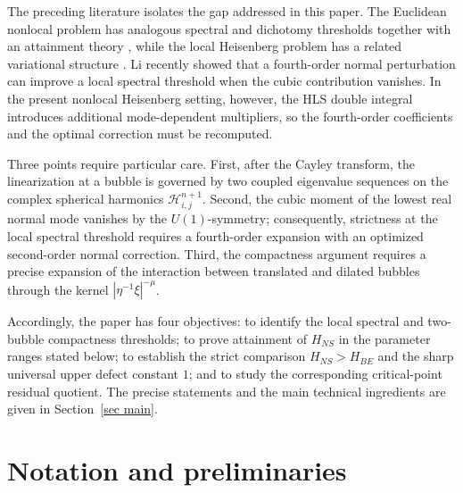 \documentclass[11pt]{article}
\begin{document}
\begingroup
The preceding literature isolates the gap addressed in this paper. The Euclidean nonlocal problem has analogous spectral and dichotomy thresholds together with an attainment theory \cite{DT25,Z26}, while the local Heisenberg problem has a related variational structure \cite{TZZ24}. Li \cite{Li26} recently showed that a fourth-order normal perturbation can improve a local spectral threshold when the cubic contribution vanishes. In the present nonlocal Heisenberg setting, however, the HLS double integral introduces additional mode-dependent multipliers, so the fourth-order coefficients and the optimal correction must be recomputed.

Three points require particular care. First, after the Cayley transform, the linearization at a bubble is governed by two coupled eigenvalue sequences on the complex spherical harmonics $\mathcal H_{i,j}^{n+1}$. Second, the cubic moment of the lowest real normal mode vanishes by the $U(1)$-symmetry; consequently, strictness at the local spectral threshold requires a fourth-order expansion with an optimized second-order normal correction. Third, the compactness argument requires a precise expansion of the interaction between translated and dilated bubbles through the kernel $|\eta^{-1}\xi|^{-\mu}$.

Accordingly, the paper has four objectives: to identify the local spectral and two-bubble compactness thresholds; to prove attainment of $H_{NS}$ in the parameter ranges stated below; to establish the strict comparison $H_{NS}>H_{BE}$ and the sharp universal upper defect constant $1$; and to study the corresponding critical-point residual quotient. The precise statements and the main technical ingredients are given in Section~\ref{sec main}.
\endgroup



\section{Notation and preliminaries}\label{secnp}
\end{document}
